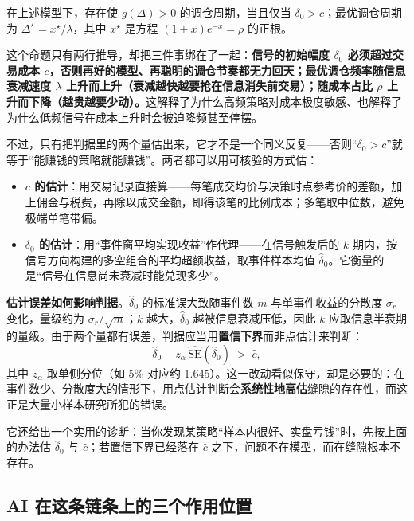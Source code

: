 \begin{proposition}[缝隙存在的必要条件]
在上述模型下，存在使 $g(\Delta)>0$ 的调仓周期，当且仅当 $\delta_0 > c$；最优调仓周期为 $\Delta^\star = x^\star/\lambda$，其中 $x^\star$ 是方程 $(1+x)e^{-x}=\rho$ 的正根。
\end{proposition}

这个命题只有两行推导，却把三件事绑在了一起：\textbf{信号的初始幅度 $\delta_0$ 必须超过交易成本 $c$，否则再好的模型、再聪明的调仓节奏都无力回天；最优调仓频率随信息衰减速度 $\lambda$ 上升而上升（衰减越快越要抢在信息消失前交易）；随成本占比 $\rho$ 上升而下降（越贵越要少动）。}这解释了为什么高频策略对成本极度敏感、也解释了为什么低频信号在成本上升时会被迫降频甚至停摆。

不过，只有把判据里的两个量估出来，它才不是一个同义反复——否则“$\delta_0>c$”就等于“能赚钱的策略就能赚钱”。两者都可以用可核验的方式估：

\begin{itemize}
  \item \textbf{$c$ 的估计}：用交易记录直接算——每笔成交均价与决策时点参考价的差额，加上佣金与税费，再除以成交金额，即得该笔的比例成本；多笔取中位数，避免极端单笔带偏。
  \item \textbf{$\delta_0$ 的估计}：用“事件窗平均实现收益”作代理——在信号触发后的 $k$ 期内，按信号方向构建的多空组合的平均超额收益，取事件样本均值 $\hat\delta_0$。它衡量的是“信号在信息尚未衰减时能兑现多少”。
\end{itemize}

\textbf{估计误差如何影响判据}。$\hat\delta_0$ 的标准误大致随事件数 $m$ 与单事件收益的分散度 $\sigma_r$ 变化，量级约为 $\sigma_r/\sqrt{m}$；$k$ 越大，$\hat\delta_0$ 越被信息衰减压低，因此 $k$ 应取信息半衰期的量级。由于两个量都有误差，判据应当用\textbf{置信下界}而非点估计来判断：
\begin{equation}
  \hat\delta_0 - z_{\alpha}\,\widehat{\mathrm{SE}}(\hat\delta_0) \;>\; \hat c ,
\end{equation}
其中 $z_\alpha$ 取单侧分位（如 5\% 对应约 1.645）。这一改动看似保守，却是必要的：在事件数少、分散度大的情形下，用点估计判断会\textbf{系统性地高估}缝隙的存在性，而这正是大量小样本研究所犯的错误。

它还给出一个实用的诊断：当你发现某策略“样本内很好、实盘亏钱”时，先按上面的办法估 $\hat\delta_0$ 与 $\hat c$；若置信下界已经落在 $\hat c$ 之下，问题不在模型，而在缝隙根本不存在。

\subsection{AI 在这条链条上的三个作用位置}

